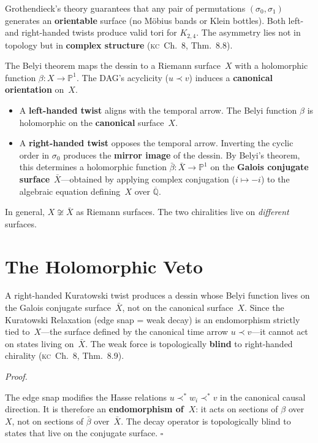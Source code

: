 \documentclass[11pt, a4paper, openany]{book}
\newcommand{\covers}{\prec^*}              %
\newcommand{\KC}[1]{\textnormal{(\textsc{kc}~#1)}}
\newcounter{thm}[chapter]
\renewenvironment{proof}[1][Proof]{%
  \par\noindent\textit{#1.}\quad
}{\hfill$\square$\par\medskip}
\begin{document}
Grothendieck's theory guarantees that any pair of permutations
$(\sigma_0, \sigma_1)$ generates an \textbf{orientable} surface
(no M\"obius bands or Klein bottles). Both left- and right-handed
twists produce valid tori for $K_{2,4}$. The asymmetry lies not in
topology but in \textbf{complex structure} \KC{Ch.~8, Thm.~8.8}.

The Belyi theorem maps the dessin to a Riemann surface~$X$ with a
holomorphic function $\beta : X \to \mathbb{P}^1$. The DAG's acyclicity
($u \prec v$) induces a \textbf{canonical orientation} on~$X$.

\begin{itemize}
  \item A \textbf{left-handed twist} aligns with the temporal arrow.
    The Belyi function $\beta$ is holomorphic on the
    \textbf{canonical} surface~$X$.
  \item A \textbf{right-handed twist} opposes the temporal arrow.
    Inverting the cyclic order in $\sigma_0$ produces the
    \textbf{mirror image} of the dessin. By Belyi's theorem, this
    determines a holomorphic function
    $\bar{\beta} : \bar{X} \to \mathbb{P}^1$ on the
    \textbf{Galois conjugate surface}~$\bar{X}$---obtained by
    applying complex conjugation ($i \mapsto -i$) to the algebraic
    equation defining~$X$ over $\overline{\mathbb{Q}}$.
\end{itemize}

\noindent
In general, $X \not\cong \bar{X}$ as Riemann surfaces. The two
chiralities live on \emph{different} surfaces.

\section{The Holomorphic Veto}\label{sec:holomorphic-veto}

\begin{theorem}\label{thm:parity-veto}
A right-handed Kuratowski twist produces a dessin whose Belyi function
lives on the Galois conjugate surface~$\bar{X}$, not on the canonical
surface~$X$. Since the Kuratowski Relaxation (edge snap = weak decay)
is an endomorphism strictly tied to~$X$---the surface defined by the
canonical time arrow $u \prec v$---it cannot act on states living
on~$\bar{X}$. The weak force is topologically \textbf{blind} to
right-handed chirality \KC{Ch.~8, Thm.~8.9}.
\end{theorem}

\begin{proof}
The edge snap modifies the Hasse relations $u \covers w_i \covers v$
in the canonical causal direction. It is therefore an
\textbf{endomorphism of~$X$}: it acts on sections of $\beta$ over~$X$,
not on sections of $\bar{\beta}$ over~$\bar{X}$. The decay operator is
topologically blind to states that live on the conjugate surface.
\end{proof}
\end{document}
